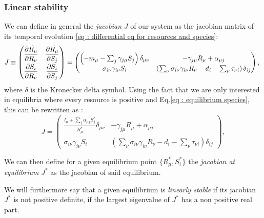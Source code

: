 \documentclass[12pt]{report}
\begin{document}
\subsubsection{Linear stability}
We can define in general the \textit{jacobian} $J$ of our system as the jacobian matrix of its temporal evolution \eqref{eq : differential eq for resources and species}:
\begin{equation}
  J \defined
\begin{pmatrix}
  \partiald{\dot{R_\mu}}{R_\nu}& \partiald{\dot{R_\mu}}{S_j} \\
  \partiald{\dot{S_i}}{R_\nu} & \partiald{\dot{S_i}}{S_j}
\end{pmatrix}
=
\begin{pmatrix}
  \left(-m_\mu-\sum_j \gamma_{j\mu}S_j\right)\delta_{\mu\nu} & -\gamma_{j\mu}R_\mu+\alpha_{\mu j} \\
  \sigma_{i\nu}\gamma_{i\nu}S_i &\left(\sum_{\nu} \sigma_{i\nu}\gamma_{i\nu}R_\nu-d_i-\sum_\nu \tau_{\nu i}\right)\delta_{ij}
\end{pmatrix}, \label{eq : definition of jacobian}
\end{equation}
where $\delta$ is the Kronecker delta symbol. Using the fact that we are only interested in equilibria where every resource is positive and Eq.\eqref{eq : equilibrium species}, this can be rewritten as :
\begin{equation}
 J = \begin{pmatrix}
   \frac{l_\mu + \sum_j \alpha_{\mu j}S_j^*}{R^*_\mu}\delta_{\mu\nu} & -\gamma_{j\mu}R_\mu+\alpha_{\mu j} \\
   \sigma_{i\nu}\gamma_{i\nu}S_i &\left(\sum_{\nu} \sigma_{i\nu}\gamma_{i\nu}R_\nu-d_i-\sum_\nu \tau_{\nu i}\right)\delta_{ij}
 \end{pmatrix}, \label{eq : definition of jacobian alternative}
\end{equation}

We can then define for a given equilibrium point $\{R^*_\mu, S^*_i\}$ the \textit{jacobian at equilibrium} $J^*$ as the jacobian of said equilibrium.

We will furthermore say that a given equilibrium is \textit{linearly stable} if its jacobian $J^*$ is not positive definite, \ie if the largest eigenvalue of $J^*$ has a non positive real part.
\end{document}
